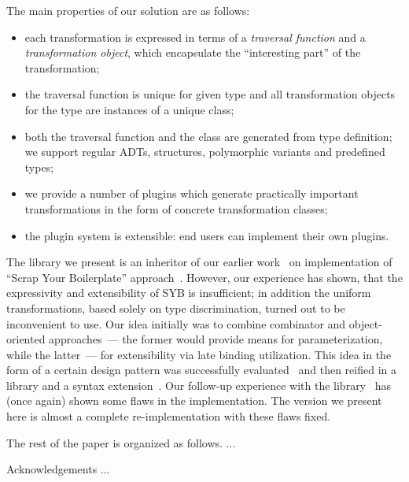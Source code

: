 The main properties of our solution are as follows:

\begin{itemize}
\item each transformation is expressed in terms of a \emph{traversal function} and a \emph{transformation object}, which encapsulate the ``interesting part''
  of the transformation;
\item the traversal function is unique for given type and all transformation objects for the type are instances of a unique class;
\item both the traversal function and the class are generated from type definition; we support regular ADTs, structures, polymorphic variants and predefined types;
\item we provide a number of plugins which generate practically important transformations in the form of concrete transformation classes;
\item the plugin system is extensible: end users can implement their own plugins.
\end{itemize}

The library we present is an inheritor of our earlier work~\cite{SYBOCaml} on implementation of ``Scrap Your Boilerplate'' approach~\cite{SYB,SYB1,SYB2}. However,
our experience has shown, that the expressivity and extensibility of SYB is insufficient; in addition the uniform transformations, based solely on type discrimination, turned out to be
inconvenient to use. Our idea initially was to combine combinator and object-oriented approaches~--- the former would provide means for parameterization, while the
latter~--- for extensibility via late binding utilization. This idea in the form of a certain design pattern was successfully evaluated~\cite{SCICO} and then reified
in a library and a syntax extension~\cite{TransformationObjects}. Our follow-up experience with the library~\cite{OCanren} has (once again) shown some flaws in the
implementation. The version we present here is almost a complete re-implementation with these flaws fixed.

The rest of the paper is organized as follows. ...

Acknowledgements ...

